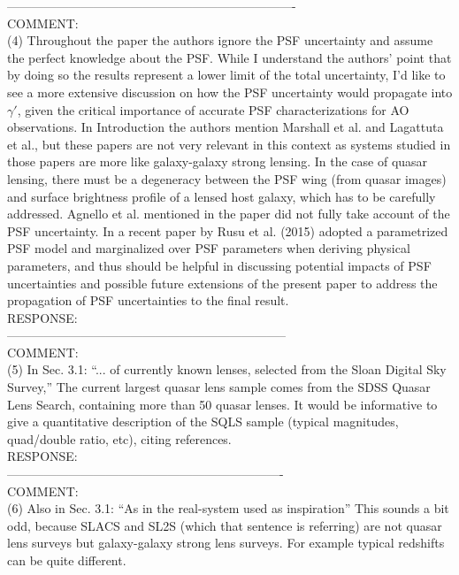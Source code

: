 \documentclass[a4paper,11pt]{article}
\begin{document}
----------------------------------------------------------------------
\\
COMMENT:
\\
(4) Throughout the paper the authors ignore the PSF uncertainty and assume the perfect knowledge about the PSF. While I understand the authors’ point that by doing so the results represent a lower limit of the total uncertainty, I’d like to see a more extensive discussion on how the PSF uncertainty would propagate into $\gamma'$, given the critical importance of accurate PSF characterizations for AO observations. In Introduction the authors mention Marshall et al. and Lagattuta et al., but these papers are not very relevant in this context as systems studied in those papers are more like galaxy-galaxy strong lensing. In the case of quasar lensing, there must be a degeneracy between the PSF wing (from quasar images) and surface brightness profile of a lensed host galaxy, which has to be carefully addressed. Agnello et al. mentioned in the paper did not fully take account of the PSF uncertainty. In a recent paper by Rusu et al. (2015) adopted a parametrized PSF model and marginalized over PSF parameters when deriving physical parameters, and thus should be helpful in discussing potential impacts of PSF uncertainties and possible future extensions of the present paper to address the propagation of PSF uncertainties to the final result.
\\

RESPONSE:
\\ 
--------------------------------------------------------------------
\\
COMMENT:
\\
(5) In Sec. 3.1: “... of currently known lenses, selected from the Sloan Digital Sky Survey,” The current largest quasar lens sample comes from the SDSS Quasar Lens Search, containing more than 50 quasar lenses. It would be informative to give a quantitative description of the SQLS sample (typical magnitudes, quad/double ratio, etc), citing references.
\\

RESPONSE:
\\

-------------------------------------------------------------------
\\
COMMENT:
\\
(6) Also in Sec. 3.1: “As in the real-system used as inspiration” This sounds a bit odd, because SLACS and SL2S (which that sentence is referring) are not quasar lens surveys but galaxy-galaxy strong lens surveys. For example typical redshifts can be quite different.
\\
\end{document}
